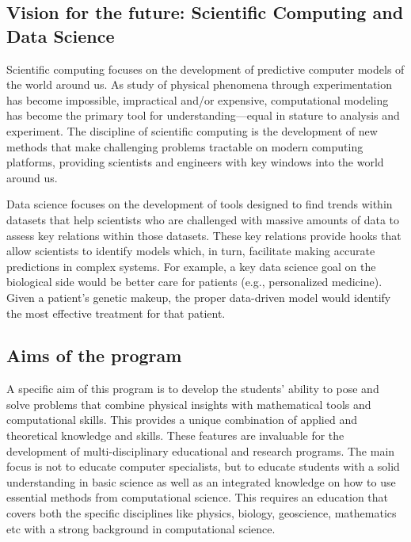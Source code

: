 \documentclass[%
oneside,                 %
final,                   %
10pt]{article}
\begin{document}
\vspace{6mm}

\subsection{Vision for the future: Scientific Computing and Data Science}

Scientific computing focuses on the development of predictive computer
models of the world around us. As study of physical phenomena through
experimentation has become impossible, impractical and/or expensive,
computational modeling has become the primary tool for
understanding—equal in stature to analysis and experiment. 
The discipline of scientific computing
is the development of new methods that make challenging problems
tractable on modern computing platforms, providing scientists and
engineers with key windows into the world around us.

Data science focuses on the development of tools designed to find
trends within datasets that help scientists who are challenged with
massive amounts of data to assess key relations within those
datasets. These key relations provide hooks that allow scientists to
identify models which, in turn, facilitate making accurate predictions
in complex systems. For example, a key data science goal on the
biological side would be better care for patients (e.g., personalized
medicine). Given a patient’s genetic makeup, the proper data-driven
model would identify the most effective treatment for that patient.

\subsection{Aims of the program}

A specific aim of this program is to develop the students' ability to pose and
solve problems that combine physical insights with mathematical tools
and computational skills. This provides a unique combination
of applied and theoretical knowledge and skills. These features are invaluable
for the development of multi-disciplinary educational and research programs.
The main focus is not to educate computer
specialists, but to educate students with a solid understanding in basic science
as well as an integrated knowledge on how  to use
essential methods from computational science. This requires an
education that covers both the specific disciplines like physics, biology,
geoscience, mathematics etc with a strong background in computational science.
\end{document}
